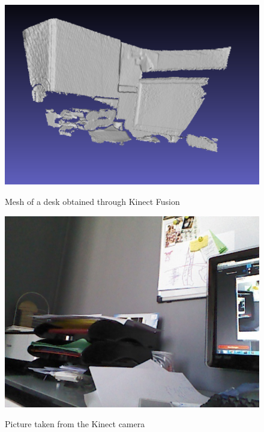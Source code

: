 \begin{figure}
\caption{Mesh of a desk obtained through Kinect Fusion}
\centering
    \includegraphics[width=1.0\textwidth]{images/mesh0.png}
\label{fig:mesh0}
\end{figure}

\begin{figure}
\caption{Picture taken from the Kinect camera}
\centering
    \includegraphics[width=1.0\textwidth]{images/picturefromkinect.jpg}
\label{fig:picture from the kinect}
\end{figure}

